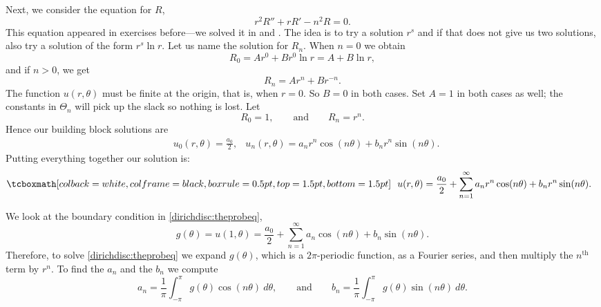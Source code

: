 Next, we consider the equation for $R$,
\begin{equation*}
r^2 R'' + r R' - n^2 R = 0.
\end{equation*}
This equation appeared in exercises before---we
solved it in 
and .  The idea is to try a solution
$r^s$ and if that does not give us two solutions, also try a solution of the form
$r^s \ln r$.  Let us name the solution for $R_n$.  When $n=0$ we obtain
\begin{equation*}
R_0 = A r^0 + B r^0 \ln r = A + B \ln r ,
\end{equation*}
and if $n > 0$, we get
\begin{equation*}
R_n = A r^n + B r^{-n} .
\end{equation*}
The function $u(r,\theta)$ must be finite at the origin, that is, when $r=0$.
So $B=0$ in both
cases.  Set $A=1$ in both cases as well; the constants in $\Theta_n$
will pick up the slack so nothing is lost.  Let
\begin{equation*}
R_0 = 1 , \qquad \text{and} \qquad
R_n = r^n .
\end{equation*}
Hence our building block solutions are
\begin{align*}
& u_0(r,\theta) = \frac{a_0}{2} ,
& u_n(r,\theta) = a_n r^n \cos(n \theta) + b_n r^n \sin(n \theta) .
\end{align*}
Putting everything together our solution is:
\begin{equation*}
\mybxbg{~~
u(r,\theta)
=
\frac{a_0}{2} +
\sum_{n=1}^\infty
a_n r^n \cos(n \theta) + b_n r^n \sin(n \theta) .
~~}
\end{equation*}

We look at the boundary condition in \eqref{dirichdisc:theprobeq},
\begin{equation*}
g(\theta) = u(1,\theta)
=
\frac{a_0}{2} +
\sum_{n=1}^\infty
a_n \cos(n \theta) + b_n \sin(n \theta) .
\end{equation*}
Therefore, to solve \eqref{dirichdisc:theprobeq}
we expand $g(\theta)$, which is 
a $2\pi$-periodic function, as a Fourier series, and then 
multiply the $n^{\text{th}}$ term by $r^n$.  To
find the $a_n$ and the $b_n$ we compute
\begin{equation*}
a_n =
\frac{1}{\pi} \int_{-\pi}^\pi g(\theta) \cos (n\theta) ~ d\theta , \qquad
\text{and} \qquad
b_n =
\frac{1}{\pi} \int_{-\pi}^\pi g(\theta) \sin (n\theta) ~ d\theta.
\end{equation*}

